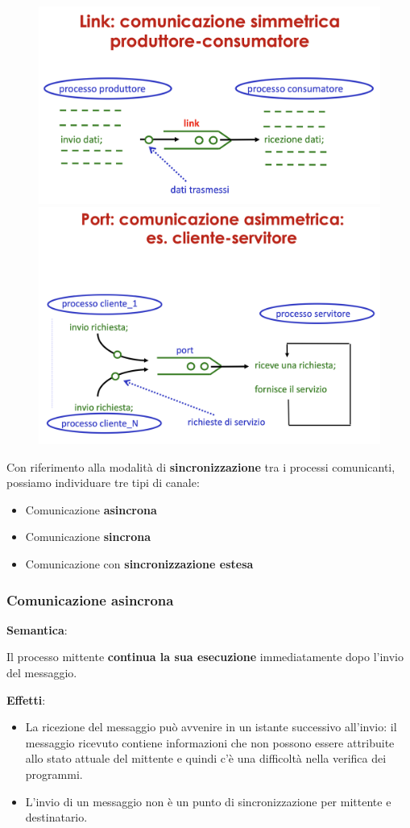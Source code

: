 \documentclass{article}
\begin{document}
\begin{figure}[htbp]
    \centering
    \includegraphics[width=0.50\columnwidth]{imgs/link.png}
    \quad
    \includegraphics[width=0.50\columnwidth]{imgs/port.png}
\end{figure}

\vspace{3mm}
Con riferimento alla modalità di \textbf{sincronizzazione} tra i processi comunicanti, possiamo individuare tre tipi di canale:
\begin{itemize}
    \item Comunicazione \textbf{asincrona}
    \item Comunicazione \textbf{sincrona}
    \item Comunicazione con \textbf{sincronizzazione estesa}
\end{itemize}

\subsubsection{Comunicazione asincrona}

\textbf{Semantica}:

Il processo mittente \textbf{continua la sua esecuzione} immediatamente dopo l'invio del messaggio.

\vspace{3mm}
\textbf{Effetti}:

\begin{itemize}
    \item La ricezione del messaggio può avvenire in un istante successivo all'invio: il messaggio ricevuto contiene informazioni che non possono essere attribuite allo stato attuale del
        mittente e quindi c'è una difficoltà nella verifica dei programmi.
    \item L'invio di un messaggio non è un punto di sincronizzazione per mittente e destinatario.
\end{itemize}
\end{document}
